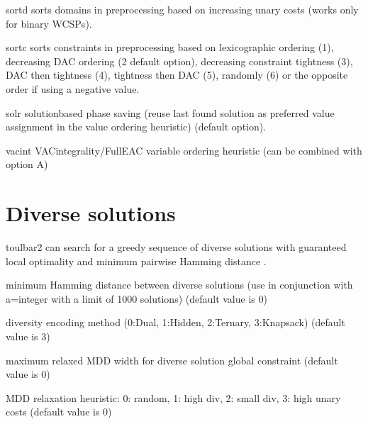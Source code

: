 \documentclass[letterpaper,10pt,openany,oneside,english]{sphinxmanual}
\begin{document}
\begin{optionlist}{3cm}
\item [\sphinxhyphen{}sortd]  
\sphinxAtStartPar
sorts domains in preprocessing based on increasing unary costs
(works only for binary WCSPs).
\item [\sphinxhyphen{}sortc]  
\sphinxAtStartPar
sorts constraints in preprocessing based on lexicographic ordering (1), decreasing DAC ordering (2 \sphinxhyphen{} default option), decreasing constraint tightness (3), DAC then tightness (4), tightness then DAC (5), randomly (6) or the opposite order if using a negative value.
\item [\sphinxhyphen{}solr]  
\sphinxAtStartPar
solution\sphinxhyphen{}based phase saving (reuse last found solution as preferred value assignment in the value ordering heuristic) (default option).
\item [\sphinxhyphen{}vacint]  
\sphinxAtStartPar
VAC\sphinxhyphen{}integrality/Full\sphinxhyphen{}EAC variable ordering heuristic (can be combined with option \sphinxhyphen{}A)
\end{optionlist}


\section{Diverse solutions}
\label{\detokenize{userdoc:diverse-solutions}}
\sphinxAtStartPar
toulbar2 can search for a greedy sequence of diverse solutions with guaranteed local optimality and minimum pairwise Hamming distance .
\begin{description}
\sphinxAtStartPar
minimum Hamming distance between diverse solutions (use in conjunction
with \sphinxhyphen{}a=integer with a limit of 1000 solutions) (default value is 0)

\sphinxAtStartPar
diversity encoding method (0:Dual, 1:Hidden, 2:Ternary, 3:Knapsack)
(default value is 3)

\sphinxAtStartPar
maximum relaxed MDD width for diverse solution global constraint
(default value is 0)

\sphinxAtStartPar
MDD relaxation heuristic: 0: random, 1: high div, 2: small div,
3: high unary costs (default value is 0)

\end{description}
\end{document}
